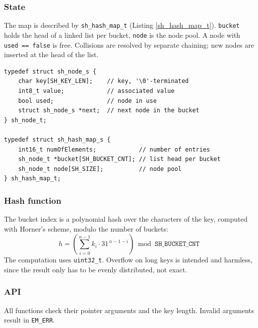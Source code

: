 \subsubsection*{State}
The map is described by \verb|sh_hash_map_t| (Listing \ref{sh_hash_map_t}).
\verb|bucket| holds the head of a linked list per bucket, \verb|node| is the
node pool. A node with \verb|used == false| is free. Collisions are resolved
by separate chaining; new nodes are inserted at the head of the list.

\begin{listing}[H]
\begin{verbatim}
typedef struct sh_node_s {
    char key[SH_KEY_LEN];    // key, '\0'-terminated
    int8_t value;            // associated value
    bool used;               // node in use
    struct sh_node_s *next;  // next node in the bucket
} sh_node_t;

typedef struct sh_hash_map_s {
    int16_t numOfElements;            // number of entries
    sh_node_t *bucket[SH_BUCKET_CNT]; // list head per bucket
    sh_node_t node[SH_SIZE];          // node pool
} sh_hash_map_t;
\end{verbatim}
\caption{Definition of the \texttt{sh\_hash\_map\_t} structure}
\label{sh_hash_map_t}
\end{listing}

\subsubsection*{Hash function}
The bucket index is a polynomial hash over the characters of the key, computed
with Horner's scheme, modulo the number of buckets:
\[
h = \left(\sum_{i=0}^{n-1} k_i \cdot 31^{\,n-1-i}\right) \bmod
\mathtt{SH\_BUCKET\_CNT}
\]
The computation uses \verb|uint32_t|. Overflow on long keys is intended and
harmless, since the result only has to be evenly distributed, not exact.

\subsubsection*{API}
All functions check their pointer arguments and the key length. Invalid
arguments result in \verb|EM_ERR|.

